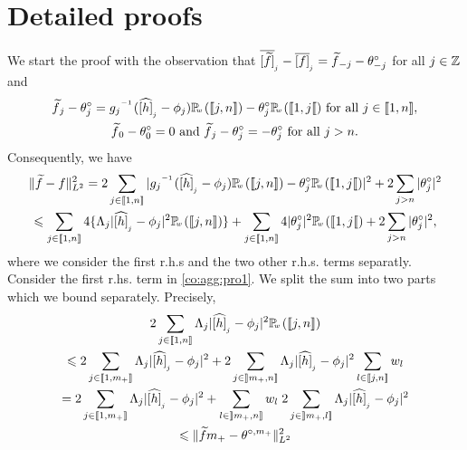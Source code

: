 \section{Detailed proofs}
\begin{pro}
We start the proof with the observation that
$\oftxdf{j}-\ofxdf[j]=\ftxdf{-j}-\fxdf[-j]$ for all $j\in\Zz$ and 
\begin{multline*}
  \ftxdf{j}-\fxdf[j]=\fedfI[j](\hfydf[j]-\fydf[j])\FuVg{\We[]}(\nset{j,\ssY})-\fxdf[j]\FuVg{\We[]}(\nsetro{1,j})\text{ for all }j\in\nset{1,\ssY},\\\ftxdf{0}-\fxdf[0]=0\text{ and }\ftxdf{j}-\fxdf[j]=-\fxdf[j]\text{ for all }j>\ssY.
\end{multline*}
Consequently, we  have
  \begin{multline}\label{co:agg:pro1}
    \VnormLp{\txdf-\xdf}^2=
   2\sum_{j\in\nset{1,\ssY}}|\fedfI[j](\hfydf[j]-\fydf[j])\FuVg{\We[]}(\nset{j,\ssY})-\fxdf[j]\FuVg{\We[]}(\nsetro{1,j})|^2+2\sum_{j>\ssY}|\fxdf[j]|^2\\
\leq
   \sum_{j\in\nset{1,\ssY}}4\{\iSv[j]|\hfydf[j]-\fydf[j]|^2 \FuVg{\We[]}(\nset{j,\ssY})\} + \sum_{j\in\nset{1,\ssY}}4|\fxdf[j]|^2\FuVg{\We[]}(\nsetro{1,j})+2\sum_{j>n}|\fxdf[j]|^2,%
 \end{multline}
where we consider the first r.h.s and the two other r.h.s. terms
separatly. Consider the first r.hs. term in \eqref{co:agg:pro1}. We split the sum into two parts which we bound separately.  Precisely,
\begin{multline}\label{co:agg:pro2}
2\sum_{j\in\nset{1,\ssY}}\iSv[j]|\hfydf[j]-\fydf[j]|^2
\FuVg{\We[]}(\nset{j,\ssY})\\
\leq 2\sum_{j\in\nset{1,\pDi}}\iSv[j]|\hfydf[j]-\fydf[j]|^2 +
2\sum_{j\in\nsetlo{\pDi,\ssY}}\iSv[j]|\hfydf[j]-\fydf[j]|^2\sum_{l\in\nset{j,\ssY}}\We[l]\\
= 2\sum_{j\in\nset{1,\pDi}}\iSv[j]|\hfydf[j]-\fydf[j]|^2 +
\sum_{l\in\nsetlo{\pDi,\ssY}}\We[l]\;2\sum_{j\in\nsetlo{\pDi,l}}\iSv[j]|\hfydf[j]-\fydf[j]|^2\\
\leq \VnormLp{\txdfPr[\pDi]-\xdfPr[\pDi]}^2

\end{multline}
\end{pro}

